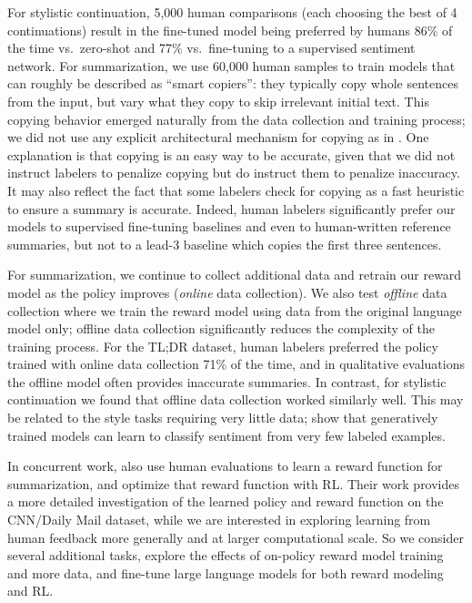 For stylistic continuation, 5,000 human comparisons (each choosing the best of 4 continuations) result in the fine-tuned model being preferred by humans 86\% of the time vs.\ zero-shot and 77\% vs.\ fine-tuning to a supervised sentiment network.  For summarization, we use 60,000 human samples to train models that can roughly be described as ``smart copiers'': they typically copy whole sentences from the input, but vary what they copy to skip irrelevant initial text.  This copying behavior emerged naturally from the data collection and training process; we did not use any explicit architectural mechanism for copying as in \citet{see2017get,gehrmann2018bottom}.  
One explanation is that copying is an easy way to be accurate, given that we did not instruct labelers to penalize copying but do instruct them to penalize inaccuracy. It may also reflect the fact that some labelers check for copying as a fast heuristic to ensure a summary is accurate.  Indeed, human labelers significantly prefer our models to supervised fine-tuning baselines and even to human-written reference summaries, but not to a lead-3 baseline which copies the first three sentences.

For summarization, we continue to collect additional data and retrain our reward model as the policy improves
(\emph{online} data collection). We also test \emph{offline} data collection where we train the reward model using data from the original language model only; offline data collection significantly reduces the complexity of the training process. For the TL;DR dataset, human labelers preferred the policy trained with online data collection
71\% of the time, and in qualitative evaluations the offline model often provides inaccurate summaries. In contrast, for stylistic continuation we found that offline data collection worked similarly well. This may be related to the style tasks requiring very little data;
\citet{radford2017learning} show that generatively trained models can learn to classify sentiment from very few labeled examples.

In concurrent work, \citet{bohm2019rl}
also use human evaluations to learn a reward function for summarization, and optimize that reward function with RL. Their work provides a more detailed investigation of the learned policy and reward function on the CNN/Daily Mail dataset, while we are interested in exploring learning from human feedback more generally and at larger computational scale. So we consider several additional tasks, explore the effects of on-policy reward model training and more data, and fine-tune large language models for both reward modeling and RL.

